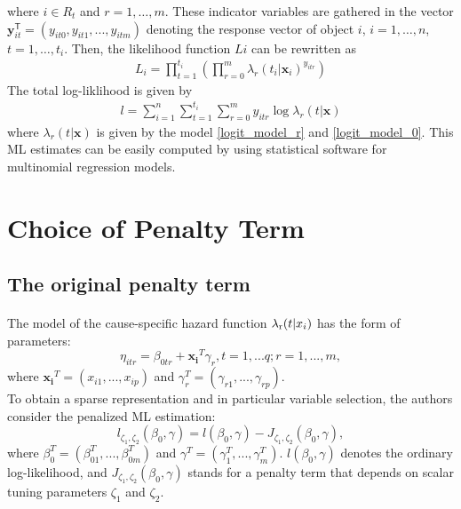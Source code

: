 \documentclass[]{article}
\begin{document}
    where $i \in R_t$ and $r=1,\dots,m$. These indicator variables are gathered in the vector $\mathbf{y}_{it}^\mathsf{T}  = (y_{it0},y_{it1},...,y_{itm})$ denoting the response vector of object $i$, $i = 1,\dots,n$, $t = 1,\dots,t_i$. Then, the likelihood function $Li$ can be rewritten as
    \begin{align}
     L_i = \prod_{t = 1}^{t_i}  (\prod_{r = 0}^{m} \lambda_{r}(t_i|\mathbf{x}_i)^{y_{itr}}) 
    \end{align}
    The total log-liklihood is given by
    \begin{align}
        l = \sum_{i=1}^{n} \sum_{t = 1}^{t_i} \sum_{r=0}^{m}
           y_{itr} \log\lambda_r(t|\mathbf{x})
    \end{align}
    where $\lambda_r(t|\mathbf{x})$ is given by the model \eqref{logit_model_r}	and \eqref{logit_model_0}. This ML estimates can be easily computed by using statistical software for multinomial regression models.
    \section{Choice of Penalty Term} %
    \subsection{The original penalty term}
    \paragraph{}
    The model of the cause-specific hazard function ${\lambda _{\rm{r}}}(t|{x_i})$ has the form of parameters:
    \begin{equation}
    {\eta _{itr}} = {\beta _{0tr}} + \mathbf{x_i}^T{\gamma _r},t = 1,...q;r = 1,...,m,
    \end{equation}
    where $\mathbf{x_i}^T=(x_{i1},...,x_{ip})$ and $\gamma _r^T=(\gamma _{r1},...,\gamma _{rp})$. \\
    
    To obtain a sparse representation and in particular variable selection, the authors consider the penalized ML estimation:
    \begin{equation}
    {l_{{\zeta _1},{\zeta _2}}}({\beta _0},\gamma ) = l({\beta _0},\gamma ) - {J_{{\zeta _1},{\zeta _2}}}({\beta _0},\gamma ),
    \end{equation}
    where  $\beta_0^T=(\beta_{01}^T,...,\beta_{0m}^T)$ and $\gamma^T=(\gamma _1^T,...,\gamma _m^T)$. $l({\beta _0},\gamma )$ denotes the ordinary log-likelihood, and ${J_{{\zeta _1},{\zeta _2}}}({\beta _0},\gamma )$ stands for a penalty term that depends on scalar tuning parameters $\zeta _1$ and $\zeta _2$.\\
    
\end{document}
